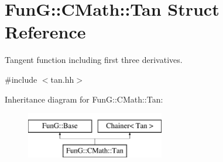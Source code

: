 \hypertarget{structFunG_1_1CMath_1_1Tan}{\section{Fun\-G\-:\-:C\-Math\-:\-:Tan Struct Reference}
\label{structFunG_1_1CMath_1_1Tan}
}


Tangent function including first three derivatives.  




{\ttfamily \#include $<$tan.\-hh$>$}

Inheritance diagram for Fun\-G\-:\-:C\-Math\-:\-:Tan\-:\begin{figure}[H]
\begin{center}
\leavevmode
\includegraphics[height=2.000000cm]{structFunG_1_1CMath_1_1Tan}
\end{center}
\end{figure}

